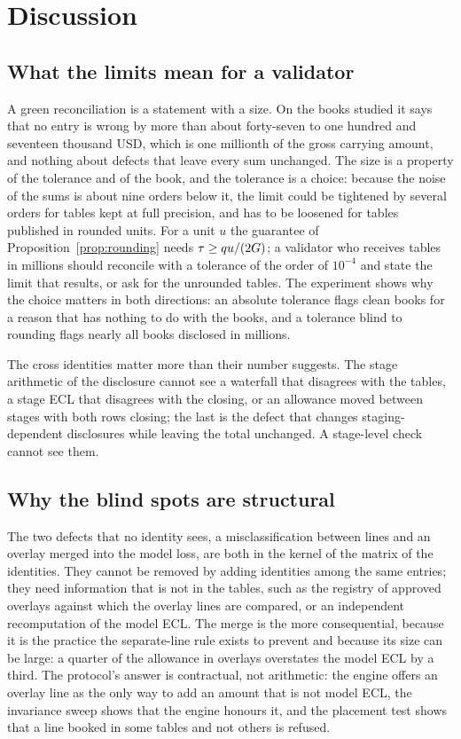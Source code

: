 \section{Discussion}
\label{sec:discussion}

\subsection{What the limits mean for a validator}
\label{sec:disc-limits}

A green reconciliation is a statement with a size.
On the books studied it says that no entry is wrong by more than about forty-seven to one hundred and seventeen thousand USD, which is one millionth of the gross carrying amount, and nothing about defects that leave every sum unchanged.
The size is a property of the tolerance and of the book, and the tolerance is a choice: because the noise of the sums is about nine orders below it, the limit could be tightened by several orders for tables kept at full precision, and has to be loosened for tables published in rounded units.
For a unit $u$ the guarantee of Proposition~\ref{prop:rounding} needs $\tau\ge qu/(2G)$; a validator who receives tables in millions should reconcile with a tolerance of the order of $10^{-4}$ and state the limit that results, or ask for the unrounded tables.
The experiment shows why the choice matters in both directions: an absolute tolerance flags clean books for a reason that has nothing to do with the books, and a tolerance blind to rounding flags nearly all books disclosed in millions.

The cross identities matter more than their number suggests.
The stage arithmetic of the disclosure cannot see a waterfall that disagrees with the tables, a stage ECL that disagrees with the closing, or an allowance moved between stages with both rows closing; the last is the defect that changes staging-dependent disclosures while leaving the total unchanged.
A stage-level check cannot see them.

\subsection{Why the blind spots are structural}
\label{sec:disc-blind}

The two defects that no identity sees, a misclassification between lines and an overlay merged into the model loss, are both in the kernel of the matrix of the identities.
They cannot be removed by adding identities among the same entries; they need information that is not in the tables, such as the registry of approved overlays against which the overlay lines are compared, or an independent recomputation of the model ECL.
The merge is the more consequential, because it is the practice the separate-line rule exists to prevent and because its size can be large: a quarter of the allowance in overlays overstates the model ECL by a third.
The protocol's answer is contractual, not arithmetic: the engine offers an overlay line as the only way to add an amount that is not model ECL, the invariance sweep shows that the engine honours it, and the placement test shows that a line booked in some tables and not others is refused.

